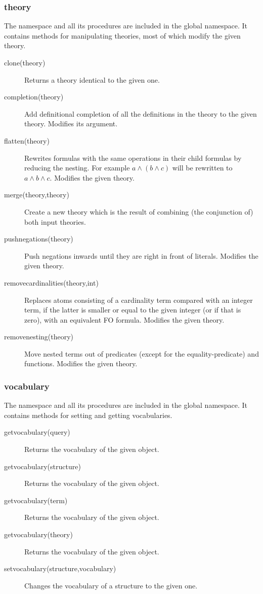 \subsubsection{theory}
The  namespace and all its procedures are included in the global namespace. It contains methods for manipulating theories, most of which modify the given theory.
\begin{description}
	\item[clone(theory)]
		Returns a theory identical to the given one.
	\item[completion(theory)]
		Add definitional completion of all the definitions in the theory to the given theory. Modifies its argument.
	\item[flatten(theory)]
		Rewrites formulas with the same operations in their child formulas by reducing the nesting. For example $a \wedge (b\wedge c)$ will be rewritten to $a\wedge b \wedge c$.
		Modifies the given theory. 
	\item[merge(theory,theory)]
 		Create a new theory which is the result of combining (the conjunction of) both input theories.
	\item[pushnegations(theory)]
 		Push negations inwards until they are right in front of literals.
 		Modifies the given theory.
	\item[removecardinalities(theory,int)]
		Replaces atoms consisting of a cardinality term compared with an integer term, if the latter is smaller or equal to the given integer (or if that is zero), with an equivalent FO formula.
 		Modifies the given theory.
	\item[removenesting(theory)]
 		Move nested terms out of predicates (except for the equality-predicate) and functions.
 		Modifies the given theory.
\end{description}

\subsubsection{vocabulary}
The  namespace and all its procedures are included in the global namespace. It contains methods for setting and getting vocabularies.
\begin{description}
	\item[getvocabulary(query)]
		Returns the vocabulary of the given object.
	\item[getvocabulary(structure)]
		Returns the vocabulary of the given object.
	\item[getvocabulary(term)]
		Returns the vocabulary of the given object.
	\item[getvocabulary(theory)]
		Returns the vocabulary of the given object.
	\item[setvocabulary(structure,vocabulary)]
		Changes the vocabulary of a structure to the given one.
\end{description}










